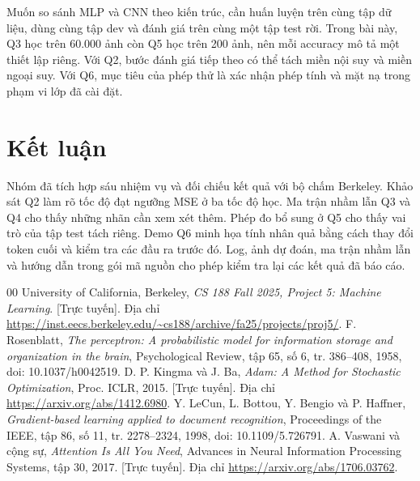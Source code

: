 \documentclass[conference]{IEEEtran}
\begin{document}
Muốn so sánh MLP và CNN theo kiến trúc, cần huấn luyện trên cùng tập dữ liệu, dùng cùng tập dev và đánh giá trên cùng một tập test rời. Trong bài này, Q3 học trên 60.000 ảnh còn Q5 học trên 200 ảnh, nên mỗi accuracy mô tả một thiết lập riêng. Với Q2, bước đánh giá tiếp theo có thể tách miền nội suy và miền ngoại suy. Với Q6, mục tiêu của phép thử là xác nhận phép tính và mặt nạ trong phạm vi lớp đã cài đặt.

\section{Kết luận}
Nhóm đã tích hợp sáu nhiệm vụ và đối chiếu kết quả với bộ chấm Berkeley. Khảo sát Q2 làm rõ tốc độ đạt ngưỡng MSE ở ba tốc độ học. Ma trận nhầm lẫn Q3 và Q4 cho thấy những nhãn cần xem xét thêm. Phép đo bổ sung ở Q5 cho thấy vai trò của tập test tách riêng. Demo Q6 minh họa tính nhân quả bằng cách thay đổi token cuối và kiểm tra các đầu ra trước đó. Log, ảnh dự đoán, ma trận nhầm lẫn và hướng dẫn trong gói mã nguồn cho phép kiểm tra lại các kết quả đã báo cáo.

\begin{thebibliography}{00}
 University of California, Berkeley, \emph{CS 188 Fall 2025, Project 5: Machine Learning}. [Trực tuyến]. Địa chỉ \url{https://inst.eecs.berkeley.edu/~cs188/archive/fa25/projects/proj5/}.
 F. Rosenblatt, \emph{The perceptron: A probabilistic model for information storage and organization in the brain}, Psychological Review, tập 65, số 6, tr. 386--408, 1958, doi: 10.1037/h0042519.
 D. P. Kingma và J. Ba, \emph{Adam: A Method for Stochastic Optimization}, Proc. ICLR, 2015. [Trực tuyến]. Địa chỉ \url{https://arxiv.org/abs/1412.6980}.
 Y. LeCun, L. Bottou, Y. Bengio và P. Haffner, \emph{Gradient-based learning applied to document recognition}, Proceedings of the IEEE, tập 86, số 11, tr. 2278--2324, 1998, doi: 10.1109/5.726791.
 A. Vaswani và cộng sự, \emph{Attention Is All You Need}, Advances in Neural Information Processing Systems, tập 30, 2017. [Trực tuyến]. Địa chỉ \url{https://arxiv.org/abs/1706.03762}.
\end{thebibliography}
\end{document}
